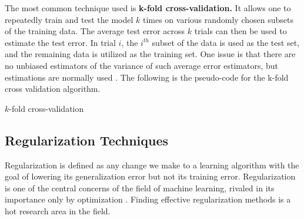 \documentclass{article}
\begin{document}
The most common technique used is \textbf{k-fold cross-validation.} It allows one to repeatedly train and test the model $k$ times on various randomly chosen subsets of the training data. The average test error across $k$ trials can then be used to estimate the test error. In trial $i$, the $i^{th}$ subset of the data is used as the test set, and the remaining data is utilized as the training set. One issue is that there are no unbiased estimators of the variance of such average error estimators, but estimations are normally used \citep{Goodfellow-et-al-2016}. The following is the pseudo-code for the k-fold cross validation algorithm.


\begin{algorithm}[h!]
  \caption{$k$-fold cross-validation}\label{k-CrossVal} 
\end{algorithm}

\subsection{Regularization Techniques}%
  \label{sub:Regularization Techniques}
Regularization is defined as any change we make to a
learning algorithm with the goal of lowering its generalization error but not its training error. Regularization is one of the central concerns of the field of machine
learning, rivaled in its importance only by optimization \citep{Goodfellow-et-al-2016}. Finding effective regularization methods is a hot research area in the field.
\end{document}
